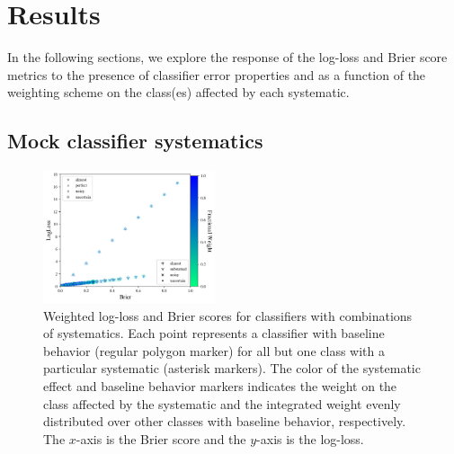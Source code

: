 \section{Results}
\label{sec:results}

In the following sections, we explore the response of the log-loss and Brier score metrics to the presence of classifier error properties and as a function of the weighting scheme on the class(es) affected by each systematic.

\subsection{Mock classifier systematics}
\label{sec:mockresults}

\begin{figure}
	\begin{center}
		\includegraphics[width=0.45\textwidth]{./fig/test_combo.png}
		\caption{Weighted log-loss and Brier scores for classifiers with combinations of systematics.
		Each point represents a classifier with baseline behavior (regular polygon marker) for all but one class with a particular systematic (asterisk markers).
		The color of the systematic effect and baseline behavior markers indicates the weight on the class affected by the systematic and the integrated weight evenly distributed over other classes with baseline behavior, respectively.
		The $x$-axis is the Brier score and the $y$-axis is the log-loss.
		}
	\end{center}
	\label{fig:all_combined}
\end{figure}

